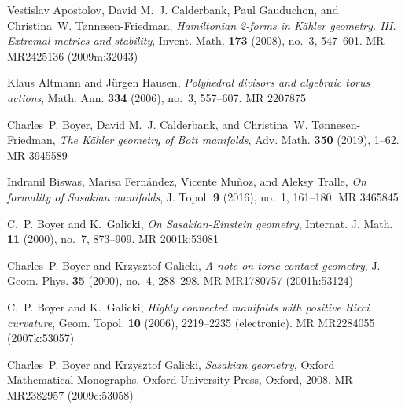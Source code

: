 \documentclass[12pt]{amsart}
\begin{document}
\def\cprime{$'$} \def\cprime{$'$} \def\cprime{$'$} \def\cprime{$'$}
  \def\cprime{$'$} \def\cprime{$'$} \def\cprime{$'$} \def\cprime{$'$}
  \def\cdprime{$''$} \def\cprime{$'$} \def\cprime{$'$} \def\cprime{$'$}
  \def\cprime{$'$}
\providecommand{\bysame}{\leavevmode\hbox to3em{\hrulefill}\thinspace}
\providecommand{\MR}{\relax\ifhmode\unskip\space\fi MR }
\providecommand{\MRhref}[2]{%
  \href{http://www.ams.org/mathscinet-getitem?mr=#1}{#2}
}
\providecommand{\href}[2]{#2}
\begin{thebibliography}{ACGTF08}

Vestislav Apostolov, David M.~J. Calderbank, Paul Gauduchon, and Christina~W.
  T{\o}nnesen-Friedman, \emph{Hamiltonian 2-forms in {K}\"ahler geometry.
  {III}. {E}xtremal metrics and stability}, Invent. Math. \textbf{173} (2008),
  no.~3, 547--601. \MR{MR2425136 (2009m:32043)}

Klaus Altmann and J\"urgen Hausen, \emph{Polyhedral divisors and algebraic
  torus actions}, Math. Ann. \textbf{334} (2006), no.~3, 557--607. \MR{2207875}

Charles~P. Boyer, David M.~J. Calderbank, and Christina~W.
  T{\o}nnesen-Friedman, \emph{The {K}\"{a}hler geometry of {B}ott manifolds},
  Adv. Math. \textbf{350} (2019), 1--62. \MR{3945589}

Indranil Biswas, Marisa Fern\'andez, Vicente Mu\~noz, and Aleksy Tralle,
  \emph{On formality of {S}asakian manifolds}, J. Topol. \textbf{9} (2016),
  no.~1, 161--180. \MR{3465845}

C.~P. Boyer and K.~Galicki, \emph{On {S}asakian-{E}instein geometry}, Internat.
  J. Math. \textbf{11} (2000), no.~7, 873--909. \MR{2001k:53081}

Charles~P. Boyer and Krzysztof Galicki, \emph{A note on toric contact
  geometry}, J. Geom. Phys. \textbf{35} (2000), no.~4, 288--298. \MR{MR1780757
  (2001h:53124)}

C.~P. Boyer and K.~Galicki, \emph{Highly connected manifolds with positive
  {R}icci curvature}, Geom. Topol. \textbf{10} (2006), 2219--2235 (electronic).
  \MR{MR2284055 (2007k:53057)}

Charles~P. Boyer and Krzysztof Galicki, \emph{Sasakian geometry}, Oxford
  Mathematical Monographs, Oxford University Press, Oxford, 2008. \MR{MR2382957
  (2009c:53058)}


\end{thebibliography}
\end{document}
